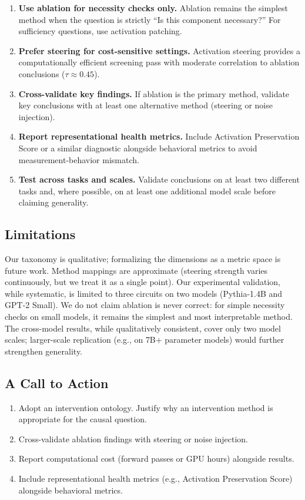 \documentclass[pdflatex,sn-mathphys-num]{sn-jnl}
\begin{document}
\begin{enumerate}
    \item \textbf{Use ablation for necessity checks only.} Ablation remains the simplest method when the question is strictly ``Is this component necessary?'' For sufficiency questions, use activation patching.
    \item \textbf{Prefer steering for cost-sensitive settings.} Activation steering provides a computationally efficient screening pass with moderate correlation to ablation conclusions ($\tau \approx 0.45$).
    \item \textbf{Cross-validate key findings.} If ablation is the primary method, validate key conclusions with at least one alternative method (steering or noise injection).
    \item \textbf{Report representational health metrics.} Include Activation Preservation Score or a similar diagnostic alongside behavioral metrics to avoid measurement-behavior mismatch.
    \item \textbf{Test across tasks and scales.} Validate conclusions on at least two different tasks and, where possible, on at least one additional model scale before claiming generality.
\end{enumerate}

\subsection{Limitations}

Our taxonomy is qualitative; formalizing the dimensions as a metric space is future work. Method mappings are approximate (steering strength varies continuously, but we treat it as a single point). Our experimental validation, while systematic, is limited to three circuits on two models (Pythia-1.4B and GPT-2 Small). We do not claim ablation is never correct: for simple necessity checks on small models, it remains the simplest and most interpretable method. The cross-model results, while qualitatively consistent, cover only two model scales; larger-scale replication (e.g., on 7B+ parameter models) would further strengthen generality.

\subsection{A Call to Action}

\begin{enumerate}
    \item Adopt an intervention ontology. Justify why an intervention method is appropriate for the causal question.
    \item Cross-validate ablation findings with steering or noise injection.
    \item Report computational cost (forward passes or GPU hours) alongside results.
    \item Include representational health metrics (e.g., Activation Preservation Score) alongside behavioral metrics.
\end{enumerate}
\end{document}
